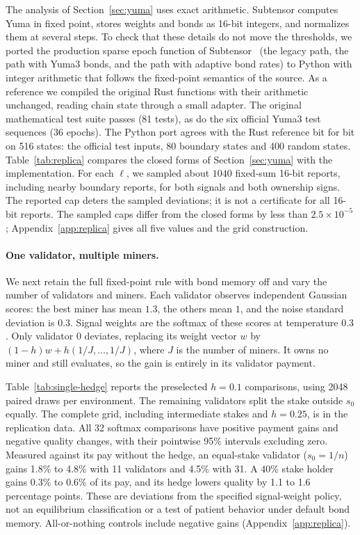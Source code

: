 \documentclass[sigconf,anonymous,review]{acmart}
\numberwithin{equation}{section}
\begin{document}
The analysis of Section~\ref{sec:yuma} uses exact arithmetic. Subtensor
computes Yuma in fixed point, stores weights and bonds as 16-bit integers, and
normalizes them at several steps. To check that these details do not move the
thresholds, we ported the production sparse epoch function of
Subtensor~\cite{subtensor2026} (the legacy path, the path with Yuma3 bonds, and
the path with adaptive bond rates) to Python with integer arithmetic that
follows the fixed-point semantics of the source. As a reference we compiled the
original Rust functions with their arithmetic unchanged, reading chain state
through a small adapter. The original
mathematical test suite passes (81 tests), as do the six official Yuma3 test
sequences (36 epochs). The Python port agrees with the Rust reference bit for
bit on 516 states: the official test inputs, 80 boundary states and 400 random
states. Table~\ref{tab:replica} compares the closed forms of
Section~\ref{sec:yuma} with the implementation. For each $\ell$, we sampled
about $1040$ fixed-sum 16-bit reports, including nearby boundary reports,
for both signals and both ownership signs. The reported cap deters the
sampled deviations; it is not a certificate for all 16-bit reports.
The sampled caps differ from the closed forms by less than
$2.5\times10^{-5}$; Appendix~\ref{app:replica} gives all five values and
the grid construction.

\paragraph{One validator, multiple miners.} We next retain the full
fixed-point rule with bond memory off and vary the number of validators
and miners. Each validator observes independent Gaussian scores: the
best miner has mean $1.3$, the others mean $1$, and the noise standard
deviation is $0.3$. Signal weights are the softmax of these scores at
temperature $0.3$. Only validator 0 deviates, replacing its weight vector
$w$ by $(1-h)w+h(1/J,\ldots,1/J)$, where $J$ is the number of miners.
It owns no miner and still evaluates, so the gain is entirely in its
validator payment.

Table~\ref{tab:single-hedge} reports the preselected $h=0.1$ comparisons,
using 2048 paired draws per environment. The remaining validators split
the stake outside $s_0$ equally. The complete grid, including intermediate
stakes and $h=0.25$, is in the replication data. All 32 softmax comparisons have
positive payment gains and negative quality changes, with their pointwise
95\% intervals excluding zero. Measured against its pay without the hedge,
an equal-stake validator ($s_0=1/n$) gains 1.8\% to 4.8\% with 11 validators
and 4.5\% with 31. A 40\% stake holder gains 0.3\% to 0.6\% of its pay, and
its hedge lowers quality by 1.1 to 1.6 percentage points. These are deviations from the specified signal-weight
policy, not an equilibrium classification or a test of patient behavior
under default bond memory. All-or-nothing controls include negative gains
(Appendix~\ref{app:replica}).
\end{document}
